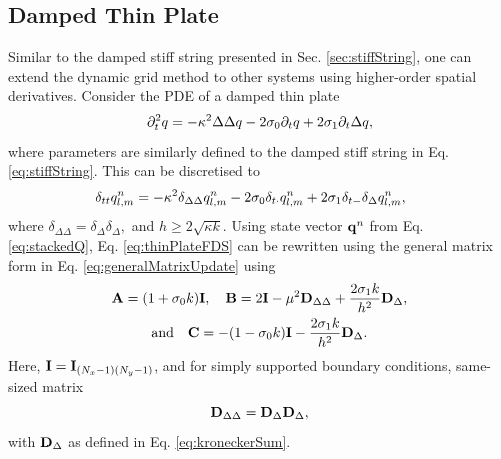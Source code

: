 \documentclass[fleqn]{jaes}
\begin{document}
\subsection{Damped Thin Plate}\label{sec:thinPlate}
Similar to the damped stiff string presented in Sec. \ref{sec:stiffString}, one can extend the dynamic grid method to other systems using higher-order spatial derivatives.
Consider the PDE of a damped thin plate \cite{Bilbao2009}
\begin{equation}\label{eq:thinPlatePDE}
    \ptt q = -\kappa^2\Delta\Delta q -2\sigma_0\pt q +2\sigma_1\pt\Delta q,
\end{equation}
where parameters are similarly defined to the damped stiff string in Eq. \eqref{eq:stiffString}. This can be discretised to 
\begin{equation}\label{eq:thinPlateFDS}
    \!\!\!\!\!\!\!\!\dtt\qlmn = -\kappa^2\delta_{\Delta\Delta}\qlmn-2\sigma_0\dtd \qlmn +2\sigma_1\dtm\dDelta \qlmn,
\end{equation}
where $\delta_{\Delta\Delta} = \delta_{\Delta}\delta_{\Delta},$ and $h \geq 2\sqrt{\kappa k}$. 
Using state vector $\mathbf{q}^n$ from Eq. \eqref{eq:stackedQ}, Eq. \eqref{eq:thinPlateFDS} can be rewritten using the general matrix form in Eq. \eqref{eq:generalMatrixUpdate} using
\begin{equation}\label{eq:thinPlateMats}
\begin{gathered}
    \A = (1+\sigma_0k)\I, \quad \B = 2\I - \mu^2 \DDeltaDelta + \frac{2\sigma_1k}{h^2}\DDeltamat,\\
    \text{and} \quad\C = -(1-\sigma_0k)\I - \frac{2\sigma_1k}{h^2}\DDeltamat.
    \end{gathered}
\end{equation}
Here, $\mathbf{I} = \mathbf{I}_{(N_x-1)(N_y-1)}$, and for simply supported boundary conditions, same-sized matrix
\begin{equation}\label{eq:DDeltaDelta}
    \DDeltaDelta = \DDeltamat\DDeltamat,
\end{equation}
with $\mathbf{D}_\Delta$ as defined in Eq. \eqref{eq:kroneckerSum}.
\end{document}
